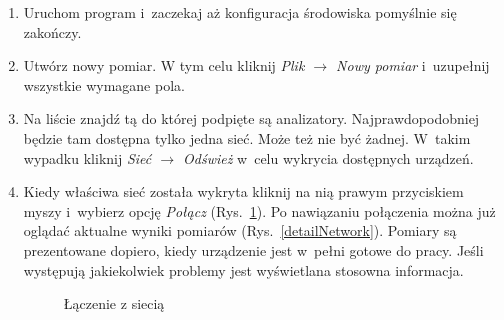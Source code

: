 \begin{enumerate}
\item Uruchom program i~zaczekaj aż konfiguracja środowiska pomyślnie się zakończy.
\item Utwórz nowy pomiar. W tym celu kliknij \textit{Plik $\rightarrow$ Nowy pomiar} i~uzupełnij wszystkie wymagane pola.
\item Na liście znajdź tą do której podpięte są analizatory. Najprawdopodobniej będzie tam dostępna tylko jedna sieć. Może też nie być żadnej. W~takim wypadku kliknij \textit{Sieć $\rightarrow$ Odśwież} w~celu wykrycia dostępnych urządzeń.
\item Kiedy właściwa sieć została wykryta kliknij na nią prawym przyciskiem myszy i~wybierz opcję \textit{Połącz} (Rys.~\ref{connect}). Po nawiązaniu połączenia można już oglądać aktualne wyniki pomiarów (Rys.~\ref{detailNetwork}). Pomiary są prezentowane dopiero, kiedy urządzenie jest w~pełni gotowe do pracy. Jeśli występują jakiekolwiek problemy jest wyświetlana stosowna informacja.
\begin{figure}[!htb]
\centering 		
  \hspace{1mm}
\caption{Łączenie z siecią} 	
\label{connect}
\end{figure}
\begin{figure}[!htb]
\centering 		

\end{figure}
\end{enumerate}
